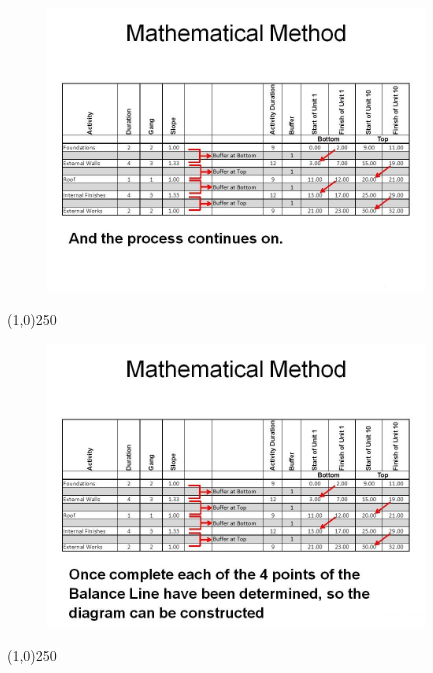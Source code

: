 \begin{frame}
\begin{figure}
	\centering
		\includegraphics[width = 10.0cm]{oldnotes/Slide295.jpg}
\end{figure}
\end{frame}
\begin{center}\line(1,0){250}\end{center}








\begin{frame}
\begin{figure}
	\centering
		\includegraphics[width = 10.0cm]{oldnotes/Slide296.jpg}
\end{figure}
\end{frame}
\begin{center}\line(1,0){250}\end{center}












